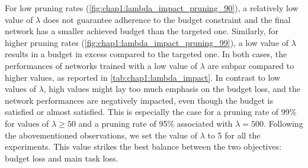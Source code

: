 For low pruning rates (\cref{fig:chap1:lambda_impact_pruning_90}), a relatively
low value of $\lambda$ does not guarantee adherence to the budget constraint and
the final network has a smaller achieved budget than the targeted one. Similarly,
for higher pruning rates (\cref{fig:chap1:lambda_impact_pruning_99}), a low
value of $\lambda$ results in a budget in excess compared to the targeted one.
In both cases, the performances of networks trained with a low value of
$\lambda$ are subpar compared to higher values, as reported in
\cref{tab:chap1:lambda_impact}. In contrast to low values of $\lambda$, high
values might lay too much emphasis on the budget loss, and the network
performances are negatively impacted, even though the budget is satisfied or
almost satisfied. This is especially the case for a pruning rate of 99\% for
values of $\lambda \geq 50$ and a pruning rate of 95\% associated with
$\lambda=500$. Following the abovementioned observations, we set the value of
$\lambda$ to 5 for all the experiments. This value strikes the best balance
between the two objectives: budget loss and main task loss.


